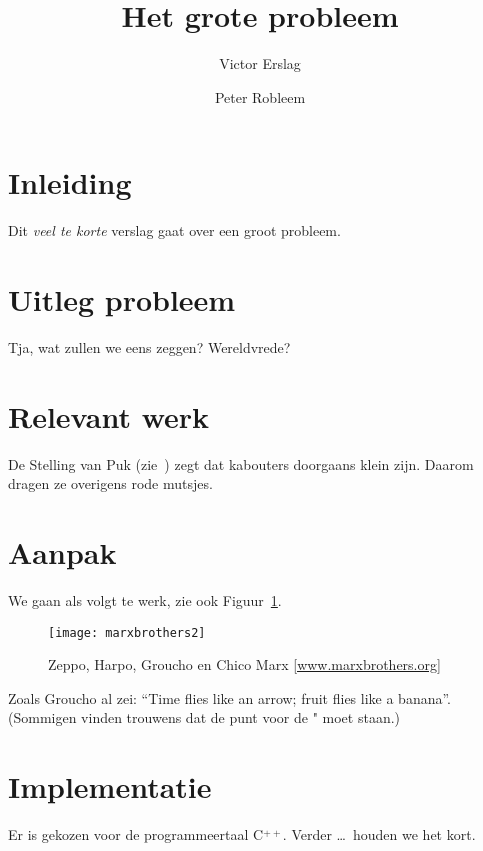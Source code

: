 \documentclass[a4paper,10pt]{article}
\author{Victor Erslag \and Peter Robleem}
\title{Het grote probleem}
\begin{document}

\maketitle

\section{Inleiding} 

Dit \emph{veel te korte} verslag gaat over een groot probleem.

\section{Uitleg probleem}

Tja, wat zullen we eens zeggen? Wereldvrede?

\section{Relevant werk}

De Stelling van Puk (zie~\cite{pukkie}) zegt dat 
kabouters doorgaans klein zijn. Daarom dragen ze overigens rode mutsjes.

\section{Aanpak}

We gaan als volgt te werk, zie ook Figuur~\ref{marx}.

\bigskip

\begin{figure}[!htbp]
\begin{center}
\texttt{[image: marxbrothers2]}
\end{center}
\caption{Zeppo, Harpo, Groucho en Chico Marx [\href{http://www.marx-brothers.org}{\underline{www.marxbrothers.org}}]}\label{marx}
\end{figure}

\noindent
Zoals Groucho al zei:
``Time flies like an arrow; fruit flies like a banana''. (Sommigen vinden trouwens dat de punt voor de " moet staan.)

\section{Implementatie}

Er is gekozen voor de programmeertaal C$\stackrel{++}{}$.
Verder \ldots\ houden we het kort.
\end{document}
